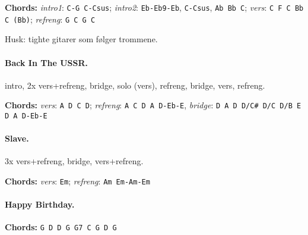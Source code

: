\documentclass[%
twoside,                 %
final,                   %
10pt]{article}
\begin{document}
\textbf{Chords:} \emph{intro1}: \Verb!C-G C-Csus!; \emph{intro2}: \Verb!Eb-Eb9-Eb!, \Verb!C-Csus!, \Verb!Ab Bb C!;
\emph{vers}: \Verb!C F C Bb C (Bb)!; \emph{refreng}: \Verb!G C G C!

Husk: tighte gitarer som følger trommene.




\paragraph{Back In The USSR.}
intro, 2x vers+refreng, bridge, solo (vers), refreng, bridge, vers, refreng.

\textbf{Chords:} \emph{vers}: \Verb!A D C D!; \emph{refreng}: \Verb!A C D A D-Eb-E!,
\emph{bridge}: \Verb!D A D D/C# D/C D/B E D A D-Eb-E!





\paragraph{Slave.}
3x vers+refreng, bridge, vers+refreng.

\textbf{Chords:} \emph{vers}: \Verb!Em!; \emph{refreng}: \Verb!Am Em-Am-Em!




\paragraph{Happy Birthday.}
\textbf{Chords:} \Verb!G D D G G7 C G D G!









\printindex
\end{document}
